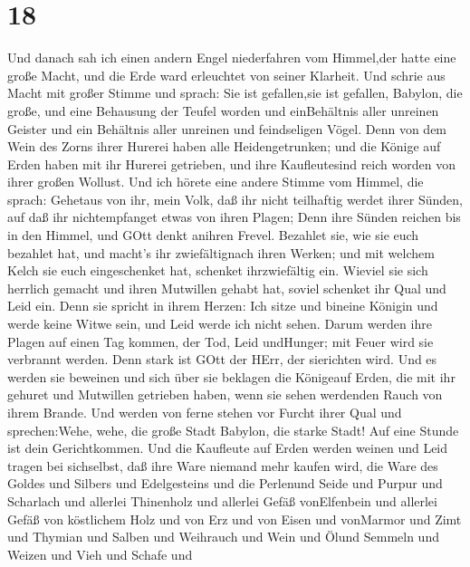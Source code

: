 \hypertarget{section-16}{%
\section{18}\label{section-16}}

 Und danach sah ich einen andern Engel niederfahren vom
Himmel,der hatte eine große Macht, und die Erde ward erleuchtet von
seiner Klarheit.  Und schrie aus Macht mit großer Stimme und
sprach: Sie ist gefallen,sie ist gefallen, Babylon, die große, und eine
Behausung der Teufel worden und einBehältnis aller unreinen Geister und
ein Behältnis aller unreinen und feindseligen Vögel.  Denn
von dem Wein des Zorns ihrer Hurerei haben alle Heidengetrunken; und die
Könige auf Erden haben mit ihr Hurerei getrieben, und ihre Kaufleutesind
reich worden von ihrer großen Wollust.  Und ich hörete eine
andere Stimme vom Himmel, die sprach: Gehetaus von ihr, mein Volk, daß
ihr nicht teilhaftig werdet ihrer Sünden, auf daß ihr nichtempfanget
etwas von ihren Plagen;  Denn ihre Sünden reichen bis in den
Himmel, und GOtt denkt anihren Frevel.  Bezahlet sie, wie
sie euch bezahlet hat, und macht's ihr zwiefältignach ihren Werken; und
mit welchem Kelch sie euch eingeschenket hat, schenket ihrzwiefältig
ein.  Wieviel sie sich herrlich gemacht und ihren Mutwillen
gehabt hat, soviel schenket ihr Qual und Leid ein. Denn sie spricht in
ihrem Herzen: Ich sitze und bineine Königin und werde keine Witwe sein,
und Leid werde ich nicht sehen.  Darum werden ihre Plagen
auf einen Tag kommen, der Tod, Leid undHunger; mit Feuer wird sie
verbrannt werden. Denn stark ist GOtt der HErr, der sierichten wird.
 Und es werden sie beweinen und sich über sie beklagen die
Königeauf Erden, die mit ihr gehuret und Mutwillen getrieben haben, wenn
sie sehen werdenden Rauch von ihrem Brande.  Und werden von
ferne stehen vor Furcht ihrer Qual und sprechen:Wehe, wehe, die große
Stadt Babylon, die starke Stadt! Auf eine Stunde ist dein Gerichtkommen.
 Und die Kaufleute auf Erden werden weinen und Leid tragen
bei sichselbst, daß ihre Ware niemand mehr kaufen wird, 
die Ware des Goldes und Silbers und Edelgesteins und die Perlenund Seide
und Purpur und Scharlach und allerlei Thinenholz und allerlei Gefäß
vonElfenbein und allerlei Gefäß von köstlichem Holz und von Erz und von
Eisen und vonMarmor  und Zimt und Thymian und Salben und
Weihrauch und Wein und Ölund Semmeln und Weizen und Vieh und Schafe und
